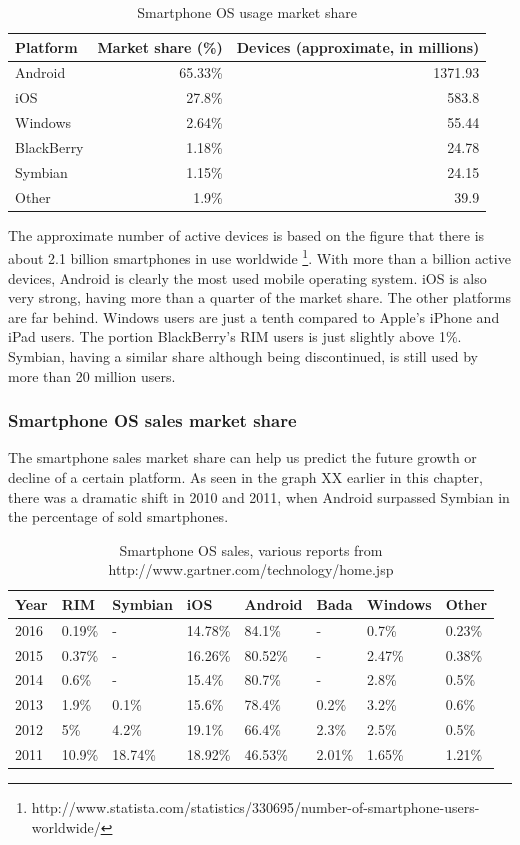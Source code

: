 \documentclass[english,master,public,dept460,male,cpdeclaration,oneside]{diploma}
\begin{document}
\begin{table}
	\centering
	\caption{Smartphone OS usage market share}
	\begin{tabular}{l r r}
		\toprule		
		Platform & Market share (\%) & Devices (approximate, in millions) \\
		\midrule
		Android & 65.33\% & 1371.93 \\
		iOS & 27.8\% & 583.8 \\
		Windows & 2.64\% & 55.44 \\
		BlackBerry & 1.18\% & 24.78 \\
		Symbian & 1.15\% & 24.15\\
		Other & 1.9\% & 39.9\\
		\midrule
	\end{tabular}
\end{table}

The approximate number of active devices is based on the figure that there is about 2.1 billion smartphones in use worldwide \footnote{http://www.statista.com/statistics/330695/number-of-smartphone-users-worldwide/}. With more than a billion active devices, Android is clearly the most used mobile operating system. iOS is also very strong, having more than a quarter of the market share. The other platforms are far behind. Windows users are just a tenth compared to Apple’s iPhone and iPad users. The portion BlackBerry’s RIM users is just slightly above 1\%. Symbian, having a similar share although being discontinued, is still used by more than 20 million users.

\subsubsection{Smartphone OS sales market share}
The smartphone sales market share can help us predict the future growth or decline of a certain platform. As seen in the graph XX earlier in this chapter, there was a dramatic shift in 2010 and 2011, when Android surpassed Symbian in the percentage of sold smartphones.

\begin{table}
	\centering
	\caption{Smartphone OS sales, various reports from http://www.gartner.com/technology/home.jsp}
	\begin{tabular}{l l l l l l l l}
		\toprule
		Year & RIM & Symbian & iOS & Android & Bada & Windows & Other\\
		\midrule		
		2016 & 0.19\% & - & 14.78\% & 84.1\% & - & 0.7\% & 0.23\% \\
		2015 & 0.37\% & - & 16.26\% & 80.52\% & - & 2.47\% & 0.38\% \\
		2014 & 0.6\% & - & 15.4\% & 80.7\% & - & 2.8\% & 0.5\% \\
		2013 & 1.9\% & 0.1\% & 15.6\% & 78.4\% & 0.2\% & 3.2\% & 0.6\% \\
		2012 & 5\% & 4.2\% & 19.1\% & 66.4\% & 2.3\% & 2.5\% & 0.5\% \\
		2011 & 10.9\% & 18.74\% & 18.92\% & 46.53\% & 2.01\% & 1.65\% & 1.21\% \\
		\midrule		
	\end{tabular}
\end{table}
\end{document}
